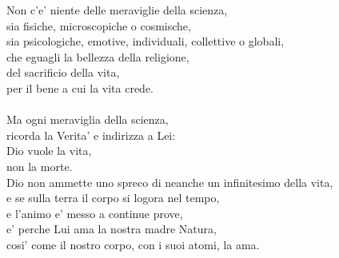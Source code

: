 \begin{haiku}
    Non c'e' niente delle meraviglie della scienza,\\
    sia fisiche, microscopiche o cosmische,\\
    sia psicologiche, emotive, individuali, collettive o globali,\\
    che eguagli la bellezza della religione,\\
    del sacrificio della vita,\\
    per il bene a cui la vita crede.\\
    \leavevmode\\
    Ma ogni meraviglia della scienza,\\
    ricorda la Verita' e indirizza a Lei:\\
    Dio vuole la vita,\\
    non la morte.\\
    Dio non ammette uno spreco di neanche un infinitesimo della vita,\\
    e se sulla terra il corpo si logora nel tempo,\\
    e l'animo e' messo a continue prove,\\
    e' perche Lui ama la nostra madre Natura,\\
    cosi' come il nostro corpo, con i suoi atomi, la ama.\\
\end{haiku}
